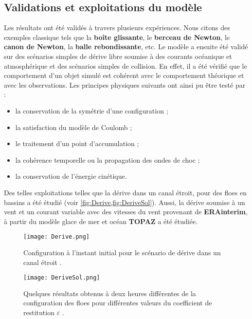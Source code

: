 \subsection{Validations et exploitations du modèle}

Les résultats ont été validés à travers plusieurs expériences. Nous citons des exemples classique tels que la \textbf{boîte glissante}, le \textbf{berceau de Newton}, le \textbf{canon de Newton}, la \textbf{balle rebondissante}, etc. Le modèle a ensuite été validé sur des scénarios simples de dérive libre soumise à des courants océanique et atmosphérique et des scénarios simples de collision. En effet, il a été vérifié que le comportement d’un objet simulé est cohérent avec le comportement théorique et avec les observations. Les principes physiques suivants ont ainsi pu être testé par \citeauthor{rabatel2015thesis} :
\begin{itemize}
    \item la conservation de la symétrie d’une configuration ;
    \item la satisfaction du modèle de Coulomb ;
    \item le traitement d’un point d’accumulation ;
    \item la cohérence temporelle ou la propagation des ondes de choc ;
    \item la conservation de l’énergie cinétique.
\end{itemize} 
Des telles exploitations telles que la dérive dans un canal étroit, pour des floes en bassins a été étudié (voir \cref{fig:Derive,fig:DeriveSol}). Aussi, la dérive soumise à un vent et un courant variable avec des vitesses du vent provenant de \textbf{ERAinterim}, à partir du modèle glace de mer et océan \textbf{TOPAZ} a été étudiée.

\begin{figure}[!ht]
    \centering
    \texttt{[image: Derive.png]}
    \caption{Configuration à l’instant initial pour le scénario de dérive dans un canal étroit \parencite[p.124]{rabatel2015thesis}.}
    \label{fig:Derive}
\end{figure}

\begin{figure}[!ht]
    \centering
    \texttt{[image: DeriveSol.png]}
    \caption{Quelques résultats obtenus à deux heures différentes de la configuration des floes pour différentes valeurs du coefficient de restitution $\varepsilon$ \parencite[p.126]{rabatel2015thesis}.}
    \label{fig:DeriveSol}
\end{figure}

